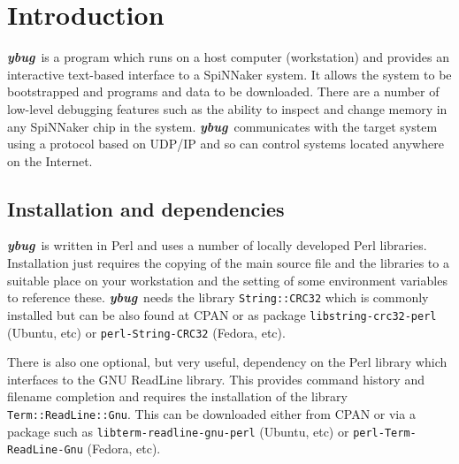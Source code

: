 %
%
%

\def\FullTitle{\textsl{ybug} - System Control Tool for SpiNNaker}
\def\ShortTitle{ybug 2.0.0}
\def\Date{8 Mar 2016}
\def\Version{2.0.0}
\def\Author{Steve Temple}
\def\Email{steven.temple@manchester.ac.uk}



\newcommand{\ybug}{\textbf{\textsl{ybug}}}

\section{Introduction}

\ybug\ is a program which runs on a host computer (workstation) and
provides an interactive text-based interface to a SpiNNaker system.
It allows the system to be bootstrapped and programs and data to be
downloaded. There are a number of low-level debugging features such as
the ability to inspect and change memory in any SpiNNaker chip in the
system. \ybug\ communicates with the target system using a protocol
based on UDP/IP and so can control systems located anywhere on the
Internet.

\subsection{Installation and dependencies}

\ybug\ is written in Perl and uses a number of locally developed Perl
libraries. Installation just requires the copying of the main source
file and the libraries to a suitable place on your workstation and the
setting of some environment variables to reference these. \ybug\ needs
the library \texttt{String::CRC32} which is commonly installed but
can be also found at CPAN or as package \texttt{libstring-crc32-perl}
(Ubuntu, etc) or \texttt{perl-String-CRC32} (Fedora, etc).

There is also one optional, but very useful, dependency on the Perl
library which interfaces to the GNU ReadLine library. This provides
command history and filename completion and requires the installation
of the library \texttt{Term::ReadLine::Gnu}. This can be downloaded
either from CPAN or via a package such
as \texttt{libterm-readline-gnu-perl} (Ubuntu, etc)
or \texttt{perl-Term-ReadLine-Gnu} (Fedora, etc).

